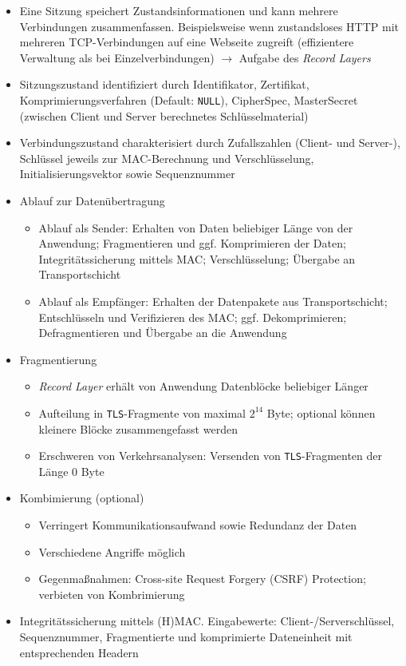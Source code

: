 \begin{description}
\begin{itemize}
		\item Eine Sitzung speichert Zustandsinformationen und kann mehrere Verbindungen zusammenfassen. Beispielsweise wenn zustandsloses HTTP mit mehreren TCP-Verbindungen auf eine Webseite zugreift (effizientere Verwaltung als bei Einzelverbindungen) \(\rightarrow\) Aufgabe des \textit{Record Layers}
		\item Sitzungszustand identifiziert durch Identifikator, Zertifikat, Komprimierungsverfahren (Default: \texttt{NULL}), CipherSpec, MasterSecret (zwischen Client und Server berechnetes Schlüsselmaterial)
		\item Verbindungszustand charakterisiert durch Zufallszahlen (Client- und Server-), Schlüssel jeweils zur MAC-Berechnung und Verschlüsselung, Initialisierungsvektor sowie Sequenznummer
		\item Ablauf zur Datenübertragung
		\begin{itemize}
			\item Ablauf als Sender: Erhalten von Daten beliebiger Länge von der Anwendung; Fragmentieren und ggf. Komprimieren der Daten; Integritätssicherung mittels MAC; Verschlüsselung; Übergabe an Transportschicht
			\item Ablauf als Empfänger: Erhalten der Datenpakete aus Transportschicht; Entschlüsseln und Verifizieren des MAC; ggf. Dekomprimieren; Defragmentieren und Übergabe an die Anwendung
		\end{itemize}
		\item Fragmentierung
		\begin{itemize}
			\item \textit{Record Layer} erhält von Anwendung Datenblöcke beliebiger Länger
			\item Aufteilung in \texttt{TLS}-Fragmente von maximal \(2^{14}\) Byte; optional können kleinere Blöcke zusammengefasst werden
			\item Erschweren von Verkehrsanalysen: Versenden von \texttt{TLS}-Fragmenten der Länge \(0\) Byte
		\end{itemize}
		\item Kombimierung (optional)
		\begin{itemize}
			\item Verringert Kommunikationsaufwand sowie Redundanz der Daten
			\item Verschiedene Angriffe möglich
			\item Gegenmaßnahmen: Cross-site Request Forgery (CSRF) Protection; verbieten von Kombrimierung
		\end{itemize}
		\item Integritätssicherung mittels (H)MAC. Eingabewerte: Client-/Serverschlüssel, Sequenznummer, Fragmentierte und komprimierte Dateneinheit mit entsprechenden Headern

\end{itemize}
\end{description}
